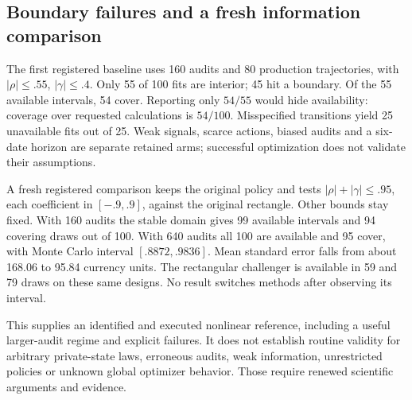 \subsection{Boundary failures and a fresh information comparison}
The first registered baseline uses 160 audits and 80 production trajectories,
with $|\rho|\le.55$, $|\gamma|\le.4$. Only 55 of 100 fits are interior;
45 hit a boundary. Of the 55 available intervals, 54 cover. Reporting only
$54/55$ would hide availability: coverage over requested calculations is
$54/100$. Misspecified transitions yield 25 unavailable fits out of 25.
Weak signals, scarce actions, biased audits and a six-date horizon are separate
retained arms; successful optimization does not validate their assumptions.

A fresh registered comparison keeps the original policy and tests
$|\rho|+|\gamma|\le.95$, each coefficient in $[-.9,.9]$, against the original
rectangle. Other bounds stay fixed. With 160 audits the stable domain gives
99 available intervals and 94 covering draws out of 100. With 640 audits all
100 are available and 95 cover, with Monte Carlo interval $[.8872,.9836]$.
Mean standard error falls from about 168.06 to 95.84 currency units. The
rectangular challenger is available in 59 and 79 draws on these same designs.
No result switches methods after observing its interval.

This supplies an identified and executed nonlinear reference, including a
useful larger-audit regime and explicit failures. It does not establish
routine validity for arbitrary private-state laws, erroneous audits, weak
information, unrestricted policies or unknown global optimizer behavior.
Those require renewed scientific arguments and evidence.

